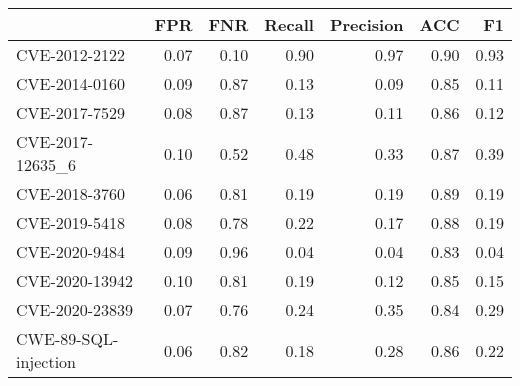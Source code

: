 \begin{tabular}{lrrrrrr}
\toprule
{} &  FPR &  FNR &  Recall &  Precision &  ACC &   F1 \\
\midrule
CVE-2012-2122        & 0.07 & 0.10 &    0.90 &       0.97 & 0.90 & 0.93 \\
CVE-2014-0160        & 0.09 & 0.87 &    0.13 &       0.09 & 0.85 & 0.11 \\
CVE-2017-7529        & 0.08 & 0.87 &    0.13 &       0.11 & 0.86 & 0.12 \\
CVE-2017-12635\_6     & 0.10 & 0.52 &    0.48 &       0.33 & 0.87 & 0.39 \\
CVE-2018-3760        & 0.06 & 0.81 &    0.19 &       0.19 & 0.89 & 0.19 \\
CVE-2019-5418        & 0.08 & 0.78 &    0.22 &       0.17 & 0.88 & 0.19 \\
CVE-2020-9484        & 0.09 & 0.96 &    0.04 &       0.04 & 0.83 & 0.04 \\
CVE-2020-13942       & 0.10 & 0.81 &    0.19 &       0.12 & 0.85 & 0.15 \\
CVE-2020-23839       & 0.07 & 0.76 &    0.24 &       0.35 & 0.84 & 0.29 \\
CWE-89-SQL-injection & 0.06 & 0.82 &    0.18 &       0.28 & 0.86 & 0.22 \\
\bottomrule
\end{tabular}
